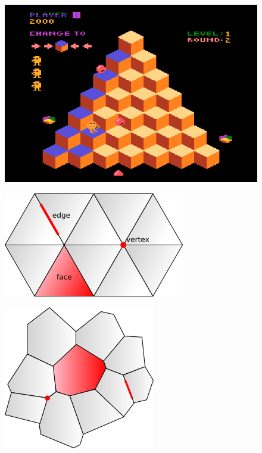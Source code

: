 \begin{figure}[h]
\centering
\includegraphics[scale=0.7]{kepek/image23.png}
\caption{}
\label{fig:image23}
\end{figure}

\begin{figure}[h]
\centering
\includegraphics[scale=0.7]{kepek/image24.png}
\caption{}
\label{fig:image24}
\end{figure}

\begin{figure}[h]
\centering
\includegraphics[scale=0.7]{kepek/image25.png}
\caption{}
\label{fig:image25}
\end{figure}

